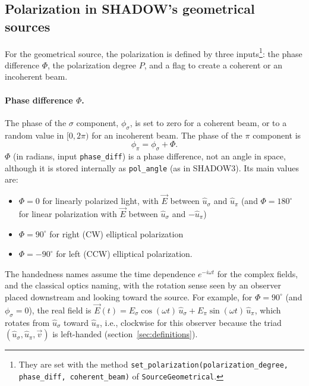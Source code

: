 \documentclass{iucr}
\begin{document}
\subsection{Polarization in SHADOW's geometrical sources}
\label{sec:polarization_shadow}

For the geometrical source, the polarization is defined by three inputs\footnote{They are set with the method {\tt set\_polarization(polarization\_degree, phase\_diff, coherent\_beam)} of {\tt SourceGeometrical}.}: the phase difference $\Phi$, the polarization degree $P$, and a flag to create a coherent or an incoherent beam.

\paragraph{Phase difference $\Phi$.}
The phase of the $\sigma$ component, $\phi_\sigma$, is set to zero for a coherent beam, or to a random value in $[0,2\pi)$ for an incoherent beam. The phase of the $\pi$ component is
\begin{equation}\label{eq:Phi}
   \phi_\pi=\phi_\sigma+\Phi.
\end{equation}
$\Phi$ (in radians, input {\tt phase\_diff}) is a phase difference, not an angle in space, although it is stored internally as {\tt pol\_angle} (as in SHADOW3). Its main values are:
\begin{itemize}
 \item $\Phi=0$ for linearly polarized light, with $\vec{E}$ between $\hat{u}_\sigma$ and $\hat{u}_\pi$ (and $\Phi=180^{\circ}$ for linear polarization with $\vec{E}$ between $\hat{u}_\sigma$ and $-\hat{u}_\pi$)
 \item $\Phi=90^{\circ}$ for right (CW) elliptical polarization
 \item $\Phi=-90^{\circ}$ for left (CCW) elliptical polarization.
\end{itemize}
The handedness names assume the time dependence $e^{-i\omega t}$ for the complex fields, and the classical optics naming, with the rotation sense seen by an observer placed downstream and looking toward the source. For example, for $\Phi=90^{\circ}$ (and $\phi_\sigma=0$), the real field is $\vec{E}(t)=E_\sigma \cos(\omega t)\,\hat{u}_\sigma + E_\pi \sin(\omega t)\,\hat{u}_\pi$, which rotates from $\hat{u}_\sigma$ toward $\hat{u}_\pi$, i.e., clockwise for this observer because the triad $(\hat{u}_\sigma, \hat{u}_\pi, \vec{v})$ is left-handed (section~\ref{sec:definitions}).
\end{document}
